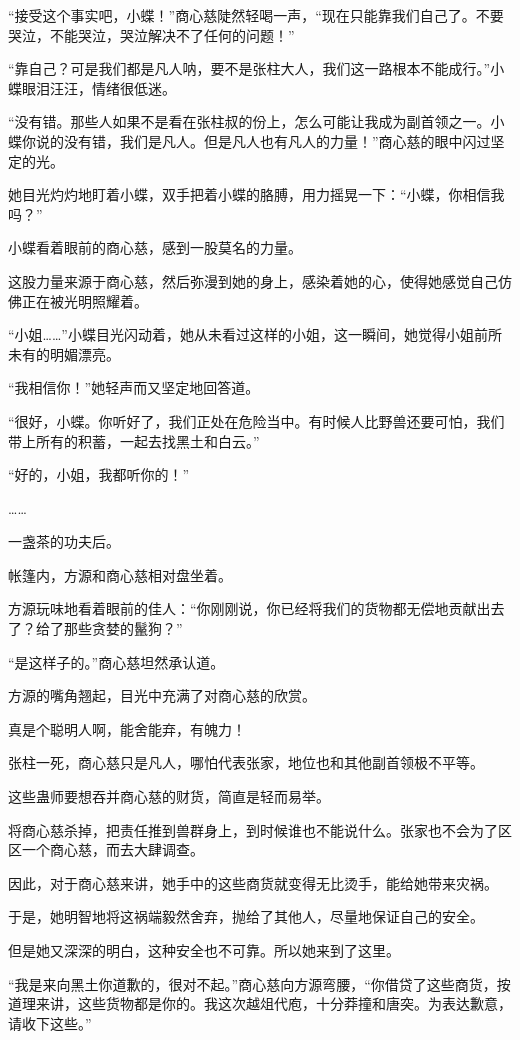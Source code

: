 \begin{this_body}
“接受这个事实吧，小蝶！”商心慈陡然轻喝一声，“现在只能靠我们自己了。不要哭泣，不能哭泣，哭泣解决不了任何的问题！”

“靠自己？可是我们都是凡人呐，要不是张柱大人，我们这一路根本不能成行。”小蝶眼泪汪汪，情绪很低迷。

“没有错。那些人如果不是看在张柱叔的份上，怎么可能让我成为副首领之一。小蝶你说的没有错，我们是凡人。但是凡人也有凡人的力量！”商心慈的眼中闪过坚定的光。

她目光灼灼地盯着小蝶，双手把着小蝶的胳膊，用力摇晃一下：“小蝶，你相信我吗？”

小蝶看着眼前的商心慈，感到一股莫名的力量。

这股力量来源于商心慈，然后弥漫到她的身上，感染着她的心，使得她感觉自己仿佛正在被光明照耀着。

“小姐……”小蝶目光闪动着，她从未看过这样的小姐，这一瞬间，她觉得小姐前所未有的明媚漂亮。

“我相信你！”她轻声而又坚定地回答道。

“很好，小蝶。你听好了，我们正处在危险当中。有时候人比野兽还要可怕，我们带上所有的积蓄，一起去找黑土和白云。”

“好的，小姐，我都听你的！”

……

一盏茶的功夫后。

帐篷内，方源和商心慈相对盘坐着。

方源玩味地看着眼前的佳人：“你刚刚说，你已经将我们的货物都无偿地贡献出去了？给了那些贪婪的鬣狗？”

“是这样子的。”商心慈坦然承认道。

方源的嘴角翘起，目光中充满了对商心慈的欣赏。

真是个聪明人啊，能舍能弃，有魄力！

张柱一死，商心慈只是凡人，哪怕代表张家，地位也和其他副首领极不平等。

这些蛊师要想吞并商心慈的财货，简直是轻而易举。

将商心慈杀掉，把责任推到兽群身上，到时候谁也不能说什么。张家也不会为了区区一个商心慈，而去大肆调查。

因此，对于商心慈来讲，她手中的这些商货就变得无比烫手，能给她带来灾祸。

于是，她明智地将这祸端毅然舍弃，抛给了其他人，尽量地保证自己的安全。

但是她又深深的明白，这种安全也不可靠。所以她来到了这里。

“我是来向黑土你道歉的，很对不起。”商心慈向方源弯腰，“你借贷了这些商货，按道理来讲，这些货物都是你的。我这次越俎代庖，十分莽撞和唐突。为表达歉意，请收下这些。”


\end{this_body}
